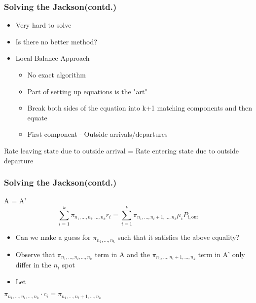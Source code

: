 \documentclass[10pt,notes]{beamer}
\begin{document}
\begin{frame}
    \frametitle{Solving the Jackson(contd.)}
    \begin{itemize}
        \item Very hard to solve
        \item Is there no better method?
        \item Local Balance Approach
        \begin{itemize}
            \item No exact algorithm
            \item Part of setting up equations is the "art"
            \item Break both sides of the equation into k+1 matching components and then equate
            \item First component - Outside arrivals/departures
        \end{itemize}
    \end{itemize}
    \begin{center} 
    Rate leaving state due to outside arrival =
    Rate entering state due to outside departure 
                
    \end{center}
    
\end{frame}

\begin{frame}
    \frametitle{Solving the Jackson(contd.)}
    \begin{center} 
        A = A'
        \[\sum_{i=1}^{k} \pi_{n_1,\ldots,n_i,\ldots,n_k} r_i = \sum_{i=1}^{k} \pi_{n_1,\ldots,n_i+1,\ldots,n_k} \mu_i P_{i,\text{out}}\]
    \end{center}
        \begin{itemize}
        \item Can we make a guess for \(\pi_{n_1,\ldots,n_k}\) such that it satisfies the above equality?
        \item Observe that \(\pi_{n_1,\ldots,n_i,\ldots,n_k}\) term in A and the \(\pi_{n_1,\ldots,n_i+1,\ldots,n_k}\) term in A' only differ in the \(n_i\) spot
        \item Let 
    \end{itemize}
    
    \begin{center} 
        \(\pi_{n_1,\ldots,n_i,\ldots,n_k} \cdot c_i = \pi_{n_1,\ldots,n_i+1,\ldots,n_k}\)
    \end{center}
\end{frame}
\end{document}
